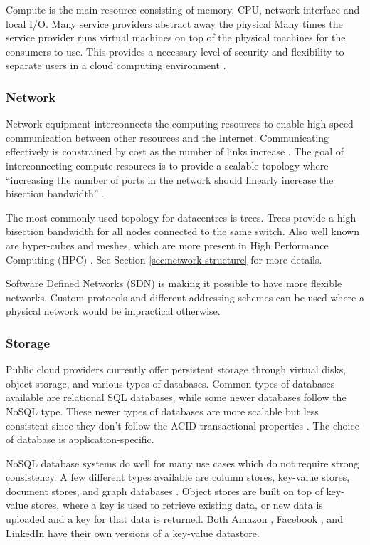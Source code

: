 \documentclass[12pt]{article}
\begin{document}
Compute is the main resource consisting of memory, CPU, network interface and local I/O. Many service providers abstract away the physical   Many times the service provider runs virtual machines on top of the physical machines for the consumers to use. This provides a necessary level of security and flexibility to separate users in a cloud computing environment \cite{Jennings2015}.

\subsubsection{Network} \label{ssub:network}

Network equipment interconnects the computing resources to enable high speed communication between other resources and the Internet. Communicating effectively is constrained by cost as the number of links increase \cite{Jennings2015}. The goal of interconnecting compute resources is to provide a scalable topology where ``increasing the number of ports in the network should linearly increase the bisection bandwidth'' \cite{abts2012guided}.

The most commonly used topology for datacentres is trees. Trees provide a high bisection bandwidth for all nodes connected to the same switch. Also well known are hyper-cubes and meshes, which are more present in High Performance Computing (HPC) \cite{Jennings2015}. See Section \ref{sec:network-structure} for more details.

Software Defined Networks (SDN) is making it possible to have more flexible networks. Custom protocols and different addressing schemes can be used where a physical network would be impractical otherwise.

\subsubsection{Storage} \label{ssub:storage}


Public cloud providers currently offer persistent storage through virtual disks, object storage, and various types of databases. Common types of databases available are relational SQL databases, while some newer databases follow the NoSQL type. These newer types of databases are more scalable but less consistent since they don't follow the ACID transactional properties \cite{Jennings2015}. The choice of database is application-specific.

NoSQL database systems do well for many use cases which do not require strong consistency. A few different types available are column stores, key-value stores, document stores, and graph databases \cite{graphDB2013}. Object stores are built on top of key-value stores, where a key is used to retrieve existing data, or new data is uploaded and a key for that data is returned. Both Amazon \cite{dynamodb}, Facebook \cite{cassandra}, and LinkedIn \cite{voldemort} have their own versions of a key-value datastore.
\end{document}
